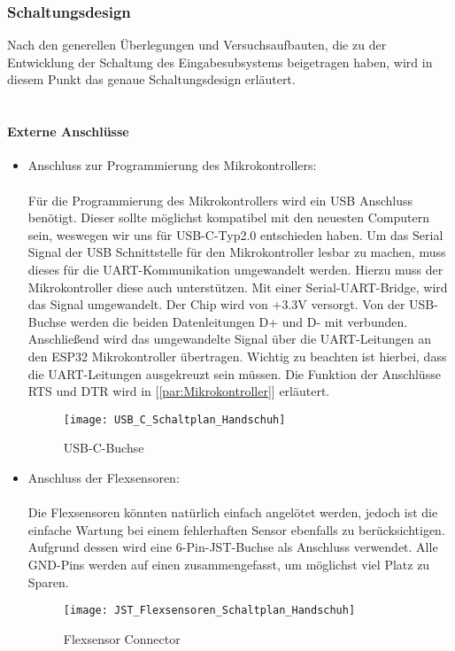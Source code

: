 \documentclass[titlepage,12pt,twoside]{article}
\begin{document}
\newpage
\subsubsection{Schaltungsdesign}
Nach den generellen Überlegungen und Versuchsaufbauten, die zu der Entwicklung der Schaltung des Eingabesubsystems beigetragen haben, wird in diesem Punkt 
das genaue Schaltungsdesign erläutert. \\
\\
\paragraph{Externe Anschlüsse}
\label{par:Externe Anschlüsse}
\hfill \break
\hfill \break
\begin{itemize}
	\item Anschluss zur Programmierung des Mikrokontrollers: \\
		  \\
		  Für die Programmierung des Mikrokontrollers wird ein USB Anschluss benötigt. Dieser sollte möglichst kompatibel mit
		  den neuesten Computern sein, weswegen wir uns für USB-C-Typ2.0 entschieden haben. Um das Serial Signal der USB Schnittstelle
		  für den Mikrokontroller lesbar zu machen, muss dieses für die UART-Kommunikation umgewandelt werden. Hierzu muss der Mikrokontroller
		  diese auch unterstützen. Mit einer Serial-UART-Bridge, wird das Signal umgewandelt. Der Chip wird von +3.3V versorgt.
		  Von der USB-Buchse werden die beiden Datenleitungen D+ und D- mit verbunden. Anschließend wird das umgewandelte Signal 
		  über die UART-Leitungen an den ESP32 Mikrokontroller übertragen. Wichtig zu beachten ist hierbei, dass die UART-Leitungen
		  ausgekreuzt sein müssen. Die Funktion der Anschlüsse RTS und DTR wird in [\textcolor{blue}{\autoref{par:Mikrokontroller}}] erläutert. \\
		  \begin{figure}[H]
			\begin{center}
				\scalebox{0.5}
				{\texttt{[image: USB\_C\_Schaltplan\_Handschuh]}}
				\caption{USB-C-Buchse}
				\label{fig:USB_C_Schaltplan_Handschuh}				
			\end{center}
		\end{figure}
	\item Anschluss der Flexsensoren: \\
		  \\
		  Die Flexsensoren könnten natürlich einfach angelötet werden, jedoch ist die einfache Wartung bei einem fehlerhaften
		  Sensor ebenfalls zu berücksichtigen. Aufgrund dessen wird eine 6-Pin-JST-Buchse als Anschluss verwendet. Alle GND-Pins
		  werden auf einen zusammengefasst, um möglichst viel Platz zu Sparen. \\
		  \begin{figure}[H]
			\begin{center}
				\scalebox{0.5}
				{\texttt{[image: JST\_Flexsensoren\_Schaltplan\_Handschuh]}}
				\caption{Flexsensor Connector}
				\label{fig:JST_Flexsensoren_Schaltplan_Handschuh}				
			\end{center}
		\end{figure}
	\end{itemize}
\end{document}
